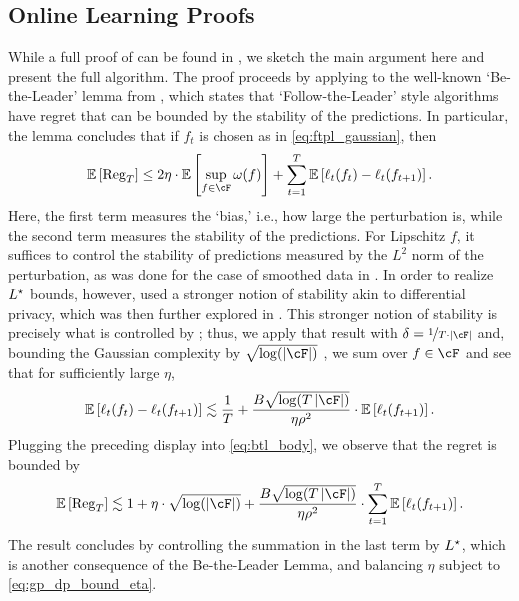 \subsection{Online Learning Proofs}\label{ssec:online-learning-proofs}
While a full proof of  can be found in , we sketch the main argument here and present the full algorithm. 
The proof proceeds by applying  to the well-known `Be-the-Leader' lemma from \citet{kalai2005efficient,cesa2006prediction}, which states that `Follow-the-Leader' style algorithms have regret that can be bounded by the stability of the predictions.  In particular, the lemma concludes that if $f_t$ is chosen as in \eqref{eq:ftpl_gaussian}, then
\begin{align}\label{eq:btl_body}
    \ee\left[ \reg_T \right] \leq 2 \eta \cdot  \ee\left[ \sup_{f \in \cF} \omega(f) \right] + \sum_{t = 1}^{T} \ee\left[ \ell_t(f_t) - \ell_t(f_{t+1}) \right].
\end{align}
Here, the first term measures the `bias,' i.e., how large the perturbation is, while the second term measures the stability of the predictions.  For Lipschitz $f$, it suffices to control the stability of predictions measured by the $L^2$ norm of the perturbation, as was done for the case of smoothed data in \citet{block2022smoothed}.  In order to realize $L^\star$ bounds, however, \citet{hutter2004prediction} used a stronger notion of stability akin to differential privacy, which was then further explored in \citet{wang2022adaptive}.  This stronger notion of stability is precisely what is controlled by ; thus, we apply that result 
with $\delta = \nicefrac{1}{T \cdot \abs{\cF}}$ and, bounding the Gaussian complexity by $\sqrt{\log(\abs{\cF})}$ \citep{boucheron2013concentration}, we sum over $f \in \cF$ and see that for sufficiently large $\eta$,
\begin{align}
    \ee\left[ \ell_t(f_t) - \ell_t(f_{t+1}) \right] \lesssim  \frac{1}{T} + \frac{B \sqrt{\log(T \abs{\cF})} }{\eta \rho^2} \cdot \ee\left[ \ell_t(f_{t+1}) \right].
\end{align}
Plugging the preceding display into \eqref{eq:btl_body}, we observe that the regret is bounded by
\begin{align}
    \ee\left[ \reg_T \right] \lesssim 1 + \eta \cdot \sqrt{\log(\abs{\cF})} +  \frac{B \sqrt{\log(T \abs{\cF})} }{\eta \rho^2} \cdot \sum_{t= 1}^T \ee\left[ \ell_t(f_{t+1}) \right].
\end{align}
The result concludes by controlling the summation in the last term by $L^\star$, which is another consequence of the Be-the-Leader Lemma, and balancing $\eta$ subject to \eqref{eq:gp_dp_bound_eta}.


